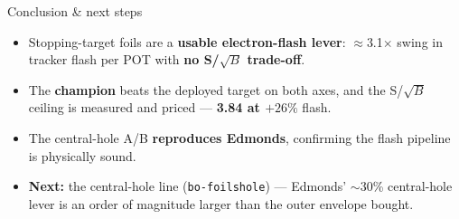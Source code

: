 \documentclass[aspectratio=169,10pt]{beamer}
\begin{document}
\begin{frame}{Conclusion \& next steps}
\begin{itemize}
  \item Stopping-target foils are a \textbf{usable electron-flash lever}: $\approx$3.1$\times$
        swing in tracker flash per POT with \textbf{no S/$\sqrt{B}$ trade-off}.
  \vspace{0.5em}
  \item The \textbf{champion} beats the deployed target on both axes, and the S/$\sqrt{B}$
        ceiling is measured and priced --- \textbf{3.84 at $+26\%$} flash.
  \vspace{0.5em}
  \item The central-hole A/B \textbf{reproduces Edmonds}, confirming the flash pipeline is
        physically sound.
  \vspace{0.5em}
  \item \textbf{Next:} the central-hole line (\texttt{bo-foilshole}) --- Edmonds' $\sim$30\%
        central-hole lever is an order of magnitude larger than the outer envelope bought.
\end{itemize}
\end{frame}
\end{document}
